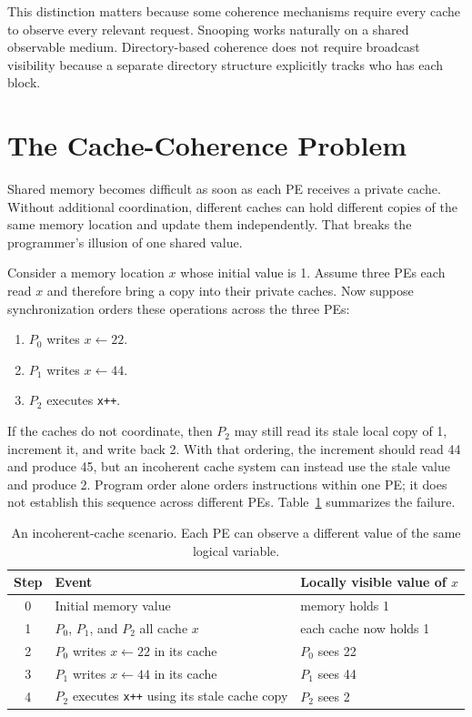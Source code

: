 This distinction matters because some coherence mechanisms require every cache to observe every relevant request.
Snooping works naturally on a shared observable medium.
Directory-based coherence does not require broadcast visibility because a separate directory structure explicitly tracks who has each block.


\section{The Cache-Coherence Problem}\label{sec:mp-coherence-problem}
Shared memory becomes difficult as soon as each PE receives a private cache.
Without additional coordination, different caches can hold different copies of the same memory location and update them independently.
That breaks the programmer's illusion of one shared value.

Consider a memory location $x$ whose initial value is 1.
Assume three PEs each read $x$ and therefore bring a copy into their private caches.
Now suppose synchronization orders these operations across the three PEs:
\begin{enumerate}
    \item $P_0$ writes $x\leftarrow 22$.
    \item $P_1$ writes $x\leftarrow 44$.
    \item $P_2$ executes \texttt{x++}.
\end{enumerate}
If the caches do not coordinate, then $P_2$ may still read its stale local copy of 1, increment it, and write back 2.
With that ordering, the increment should read 44 and produce 45, but an incoherent cache system can instead use the stale value and produce 2.
Program order alone orders instructions within one PE; it does not establish this sequence across different PEs.
Table~\ref{tab:mp-incoherent-example} summarizes the failure.
\begin{table}[t]
    \centering
    \renewcommand{\arraystretch}{1.15}
    \begin{tabular}{|c|l|l|}
        \hline
        Step & Event                                                  & Locally visible value of $x$ \\
        \hline
        0    & Initial memory value                                   & memory holds 1               \\
        \hline
        1    & $P_0$, $P_1$, and $P_2$ all cache $x$                  & each cache now holds 1       \\
        \hline
        2    & $P_0$ writes $x\leftarrow 22$ in its cache             & $P_0$ sees 22                \\
        \hline
        3    & $P_1$ writes $x\leftarrow 44$ in its cache             & $P_1$ sees 44                \\
        \hline
        4    & $P_2$ executes \texttt{x++} using its stale cache copy & $P_2$ sees 2                 \\
        \hline
    \end{tabular}
    \caption{An incoherent-cache scenario. Each PE can observe a different value of the same logical variable.}
    \label{tab:mp-incoherent-example}
\end{table}


